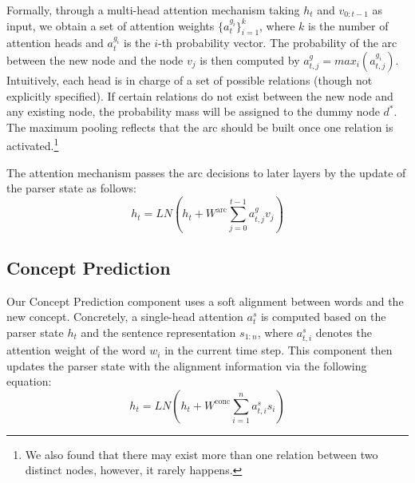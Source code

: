 \documentclass[11pt,a4paper]{article}
\begin{document}
	Formally, through a multi-head attention mechanism taking $h_t$ and $v_{0:t-1}$ as input, we obtain a set of attention weights $\{a^{g_i}_t\}_{i=1}^k$, where $k$ is the number of attention heads and $a^{g_i}_t$ is the $i$-th probability vector. The probability of the arc between the new node and the node $v_j$ is then computed by  $a^{g}_{t,j} = max_i(a^{g_i}_{t,j})$. Intuitively, each head is in charge of a set of possible relations (though not explicitly specified). If certain relations do not exist between the new node and any existing node, the probability mass will be assigned to the dummy node $d^*$. The maximum pooling reflects that the arc should be built once one relation is activated.\footnote{We also found that there may exist more than one relation between two distinct nodes, however, it rarely happens.}
	
	The attention mechanism passes the arc decisions to later layers by the update of the parser state as follows:
	\begin{equation}
	h_t = LN(h_t + W^{\text{arc}}\sum_{j=0}^{t-1} a^{g}_{t,j} v_j )
	\nonumber
	\end{equation}
	\subsection{Concept Prediction}
	\label{cp}
	Our Concept Prediction component uses a soft alignment between words and the new concept. Concretely, a single-head attention $a^s_t$ is computed based on the parser state $h_t$  and the sentence representation $s_{1:n}$, where $a^s_{t,i}$ denotes the attention weight of the word $w_i$ in the current time step. This component then updates the parser state with the alignment information via the following equation:
	\begin{equation}
	h_t = LN(h_t + W^{\text{conc}}\sum_{i=1}^{n} a^s_{t,i} s_i )
	\nonumber
	\end{equation}
	
\end{document}
